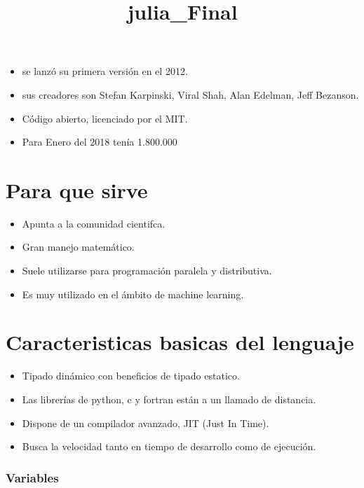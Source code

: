 \documentclass[11pt]{article}
\title{julia\_Final}
\begin{document}
    
    
    \maketitle
    
    

    
    

    \begin{itemize}
\item
  se lanzó su primera versión en el 2012.
\item
  sus creadores son Stefan Karpinski, Viral Shah, Alan Edelman, Jeff
  Bezanson.
\item
  Código abierto, licenciado por el MIT.
\item
  Para Enero del 2018 tenía 1.800.000
\end{itemize}

    \section{Para que sirve}\label{para-que-sirve}

    \begin{itemize}
\item
  Apunta a la comunidad cientifca.
\item
  Gran manejo matemático.
\item
  Suele utilizarse para programación paralela y distributiva.
\item
  Es muy utilizado en el ámbito de machine learning.
\end{itemize}

    \section{Caracteristicas basicas del
lenguaje}\label{caracteristicas-basicas-del-lenguaje}

    \begin{itemize}
\item
  Tipado dinámico con beneficios de tipado estatico.
\item
  Las librerías de python, c y fortran están a un llamado de distancia.
\item
  Dispone de un compilador avanzado, JIT (Just In Time).
\item
  Busca la velocidad tanto en tiempo de desarrollo como de ejecución.
\end{itemize}

    \subsubsection{Variables}\label{variables}
\end{document}
